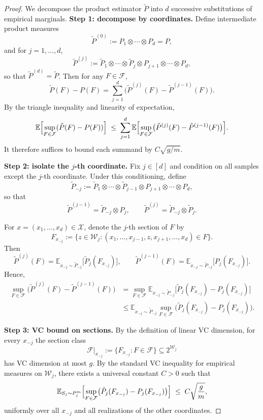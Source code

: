 \documentclass[arxiv]{colt2026}
\newcommand{\X}{\mathcal{X}}
\newcommand{\F}{\mathcal{F}}
\newcommand{\W}{\mathcal{W}}
\newcommand{\E}{\mathbb{E}}
\begin{document}
\begin{proof}
We decompose the product estimator $\tilde P$ into $d$ successive substitutions
of empirical marginals.
\medskip
\noindent\textbf{Step 1: decompose by coordinates.}
Define intermediate product measures
\[
\tilde P^{(0)} := P_1 \otimes \cdots \otimes P_d = P,
\]
and for $j=1,\dots,d$,
\[
\tilde P^{(j)} :=
\tilde P_1 \otimes \cdots \otimes \tilde P_j
\otimes P_{j+1} \otimes \cdots \otimes P_d,
\]
so that $\tilde P^{(d)}=\tilde P$.
Then for any $F\in\F$,
\[
\tilde P(F)-P(F)
= \sum_{j=1}^d \bigl(\tilde P^{(j)}(F)-\tilde P^{(j-1)}(F)\bigr).
\]
By the triangle inequality and linearity of expectation,
\[
\E\Bigl[\sup_{F\in\F}(\tilde P(F)-P(F))\Bigr]
\;\le\;
\sum_{j=1}^d
\E\Bigl[\sup_{F\in\F}
\bigl(\tilde P^{(j)}(F)-\tilde P^{(j-1)}(F)\bigr)\Bigr].
\]
It therefore suffices to bound each summand by $C\sqrt{g/m}$.

\medskip
\noindent\textbf{Step 2: isolate the $j$-th coordinate.}
Fix $j\in[d]$ and condition on all samples except the $j$-th coordinate.
Under this conditioning, define
\[
\tilde P_{-j}
:=
\tilde P_1 \otimes \cdots \otimes \tilde P_{j-1}
\otimes P_{j+1} \otimes \cdots \otimes P_d,
\]
so that
\[
\tilde P^{(j-1)} = \tilde P_{-j} \otimes P_j,
\qquad
\tilde P^{(j)}   = \tilde P_{-j} \otimes \tilde P_j.
\]

For $x=(x_1,\dots,x_d)\in\X$, denote the $j$-th section of $F$ by
\[
F_{x_{-j}}
:=
\{z\in\W_j :
(x_1,\dots,x_{j-1},z,x_{j+1},\dots,x_d)\in F\}.
\]
Then
\[
\tilde P^{(j)}(F)
=
\E_{x_{-j}\sim\tilde P_{-j}}\bigl[\tilde P_j(F_{x_{-j}})\bigr],
\qquad
\tilde P^{(j-1)}(F)
=
\E_{x_{-j}\sim\tilde P_{-j}}\bigl[P_j(F_{x_{-j}})\bigr].
\]
Hence,
\begin{align*}
\sup_{F\in\F}\bigl(\tilde P^{(j)}(F)-\tilde P^{(j-1)}(F)\bigr)
&=
\sup_{F\in\F}
\E_{x_{-j}\sim\tilde P_{-j}}
\bigl[\tilde P_j(F_{x_{-j}})-P_j(F_{x_{-j}})\bigr]\\
&\le
\E_{x_{-j}\sim\tilde P_{-j}}
\sup_{F\in\F}
\bigl(\tilde P_j(F_{x_{-j}})-P_j(F_{x_{-j}})\bigr).
\end{align*}

\medskip
\noindent\textbf{Step 3: VC bound on sections.}
By the definition of linear VC dimension, for every $x_{-j}$ the section class
\[
\F|_{x_{-j}}
:= \{F_{x_{-j}} : F\in\F\} \subseteq 2^{\W_j}
\]
has VC dimension at most $g$.
By the standard VC inequality for empirical measures on $\W_j$,
there exists a universal constant $C>0$ such that
\[
\E_{S_j\sim P_j^m}
\Bigl[
\sup_{F\in\F}
\bigl(\tilde P_j(F_{x_{-j}})-P_j(F_{x_{-j}})\bigr)
\Bigr]
\;\le\;
C\sqrt{\frac{g}{m}},
\]
uniformly over all $x_{-j}$ and all realizations of the other coordinates.


\end{proof}
\end{document}
